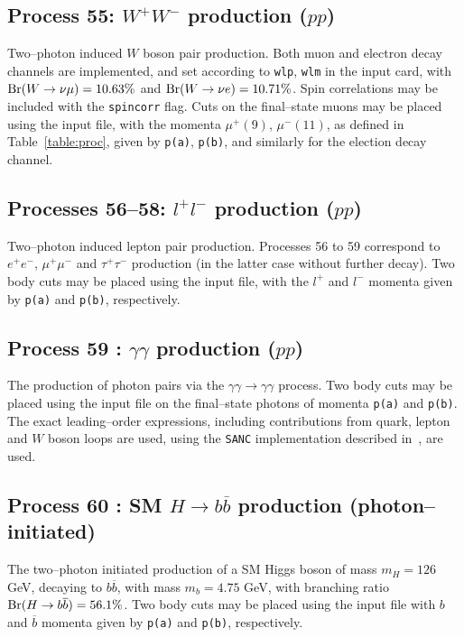 \documentclass[12pt]{article}
\begin{document}
\subsection{Process 55: $W^+W^-$ production ($pp$)}

Two--photon induced $W$ boson pair production. Both muon and electron decay channels are implemented, and set according to \texttt{wlp}, 
\texttt{wlm} in the input card, with ${\rm Br}(W\to \nu \mu)=10.63\%$ and ${\rm Br}(W\to \nu e)=10.71\%$. Spin correlations may be  included with 
the \texttt{spincorr} flag. Cuts on the final--state muons may be placed using the input file, with the momenta $\mu^+(9)$, $\mu^-(11)$, as 
defined in Table~\ref{table:proc}, given by \texttt{p(a)}, \texttt{p(b)},  and similarly for the election decay channel.

\subsection{Processes 56--58: $l^+l^-$ production ($pp$)}

Two--photon induced lepton pair production. Processes 56 to 59 correspond to $e^+e^-$, $\mu^+\mu^-$ and $\tau^+\tau^-$ production (in the latter 
case without further decay).  Two body cuts may be placed using the input file, with the $l^+$ and $l^-$ momenta given by \texttt{p(a)} and 
\texttt{p(b)}, respectively.


\subsection{Process 59 : $\gamma\gamma$ production ($pp$)}

The production of photon pairs via the $\gamma \gamma \to\gamma\gamma$ process. Two body cuts may be placed using the input file on the 
final--state photons of momenta  \texttt{p(a)} and \texttt{p(b)}.  
The exact leading--order expressions, including contributions from quark, lepton and $W$ boson loops are used, using the \texttt{SANC} implementation
 described in~\cite{Bardin:2009gq}, are used.

\subsection{Process 60 : SM $H\to b\overline{b}$ production (photon--initiated)}

The two--photon initiated production of a SM Higgs boson of mass $m_H=126$ GeV, decaying to $b\overline{b}$, with mass $m_b=4.75$ GeV, with 
branching ratio ${\rm Br}(H\to b\overline{b})=56.1\%$. Two body cuts may be placed using the input file with $b$ and $\overline{b}$ momenta 
given by \texttt{p(a)} and \texttt{p(b)}, respectively.
\end{document}
